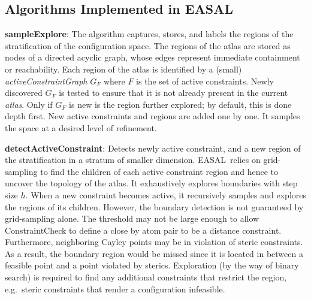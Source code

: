 \subsection{Algorithms Implemented in EASAL}
\label{sec:algorithms}



\textbf{sampleExplore}:
The algorithm captures, stores, and labels the regions of the stratification of the configuration space.
The regions of the atlas are stored as nodes of a directed acyclic graph,  whose edges represent immediate containment or reachability.
Each region of the atlas is identified by a (small) \textit{activeConstraintGraph} $G_F$ where $F$ is the set of active constraints.
Newly discovered $G_F$ is tested to ensure that it is not already present in the current \emph{atlas}.
Only if $G_F$ is new is the region further explored; by default, this is done depth first.
New active constraints and regions are added one by one.
It samples the space at a desired level of refinement.\\


\textbf{detectActiveConstraint}: Detects newly active constraint, and a new region of the stratification in a stratum of smaller dimension. EASAL\ relies on grid-sampling to find the children of each active constraint region and hence to uncover the topology of the atlas.
It exhaustively explores boundaries with step size $h$. When a new constraint becomes active, it recursively samples and explores the regions of its children.
%
However, the boundary detection is not guaranteed by grid-sampling alone.
The threshold may not be large enough to allow ConstraintCheck to define a close by atom pair to be a distance constraint. Furthermore, neighboring Cayley points may be in violation of steric constraints.
As a result, the boundary region would be missed since it is located in between a feasible point and a point violated by sterics. Exploration (by the way of binary search) is required to find any additional constraints that restrict the region, e.g.\ steric constraints that render a configuration infeasible.
